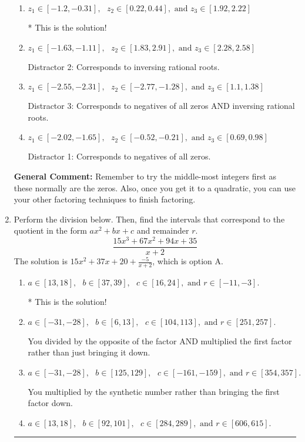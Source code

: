 \documentclass{extbook}[14pt]
\newcommand{\litem}[1]{\item #1

\rule{\textwidth}{0.4pt}}
\begin{document}
\begin{enumerate}
{\begin{enumerate}[label=\Alph*.]
 Distractor 4: Corresponds to moving factors from one rational to another.
\item \( z_1 \in [-1.2, -0.31], \text{   }  z_2 \in [0.22, 0.44], \text{   and   } z_3 \in [1.92, 2.22] \)

* This is the solution!
\item \( z_1 \in [-1.63, -1.11], \text{   }  z_2 \in [1.83, 2.91], \text{   and   } z_3 \in [2.28, 2.58] \)

 Distractor 2: Corresponds to inversing rational roots.
\item \( z_1 \in [-2.55, -2.31], \text{   }  z_2 \in [-2.77, -1.28], \text{   and   } z_3 \in [1.1, 1.38] \)

 Distractor 3: Corresponds to negatives of all zeros AND inversing rational roots.
\item \( z_1 \in [-2.02, -1.65], \text{   }  z_2 \in [-0.52, -0.21], \text{   and   } z_3 \in [0.69, 0.98] \)

 Distractor 1: Corresponds to negatives of all zeros.
\end{enumerate}

\textbf{General Comment:} Remember to try the middle-most integers first as these normally are the zeros. Also, once you get it to a quadratic, you can use your other factoring techniques to finish factoring.
}
\litem{
Perform the division below. Then, find the intervals that correspond to the quotient in the form $ax^2+bx+c$ and remainder $r$.
\[ \frac{15x^{3} +67 x^{2} +94 x + 35}{x + 2} \]The solution is \( 15x^{2} +37 x + 20 + \frac{-5}{x + 2} \), which is option A.\begin{enumerate}[label=\Alph*.]
\item \( a \in [13, 18], \text{   } b \in [37, 39], \text{   } c \in [16, 24], \text{   and   } r \in [-11, -3]. \)

* This is the solution!
\item \( a \in [-31, -28], \text{   } b \in [6, 13], \text{   } c \in [104, 113], \text{   and   } r \in [251, 257]. \)

 You divided by the opposite of the factor AND multiplied the first factor rather than just bringing it down.
\item \( a \in [-31, -28], \text{   } b \in [125, 129], \text{   } c \in [-161, -159], \text{   and   } r \in [354, 357]. \)

 You multiplied by the synthetic number rather than bringing the first factor down.
\item \( a \in [13, 18], \text{   } b \in [92, 101], \text{   } c \in [284, 289], \text{   and   } r \in [606, 615]. \)


\end{enumerate}}
\end{enumerate}
\end{document}
